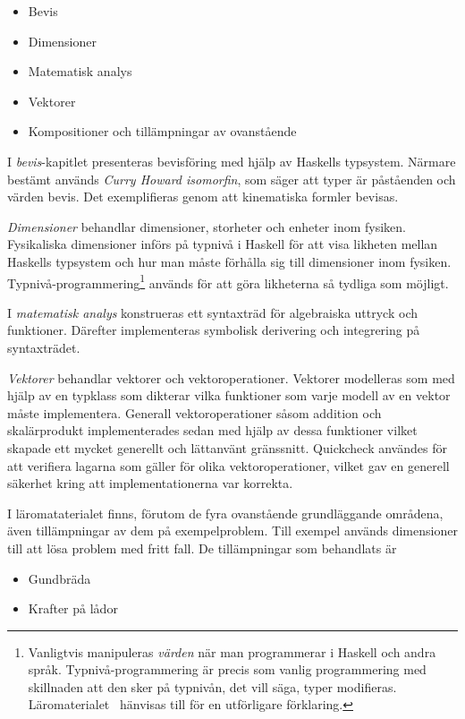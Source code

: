 \begin{draft}
\begin{itemize}
  \item Bevis
  \item Dimensioner
  \item Matematisk analys
  \item Vektorer
  \item Kompositioner och tillämpningar av ovanstående
\end{itemize}

I \textit{bevis}-kapitlet presenteras bevisföring med hjälp av Haskells
typsystem. Närmare bestämt används \textit{Curry Howard isomorfin}, som säger
att typer är påståenden och värden bevis.\cite{chi} Det exemplifieras genom att
kinematiska formler bevisas. 

\textit{Dimensioner} behandlar dimensioner, storheter och enheter inom fysiken.
Fysikaliska dimensioner införs på typnivå i Haskell för att visa likheten mellan
Haskells typsystem och hur man måste förhålla sig till dimensioner inom fysiken.
Typnivå-programmering\footnote{Vanligtvis manipuleras \textit{värden} när man
programmerar i Haskell och andra språk. Typnivå-programmering är precis som
vanlig programmering med skillnaden att den sker på typnivån, det vill säga,
typer modifieras. Läromaterialet~\cite{LYAP} hänvisas till för en utförligare
förklaring.} används för att göra likheterna så tydliga som möjligt.

I \textit{matematisk analys} konstrueras ett syntaxträd för algebraiska uttryck
och funktioner. Därefter implementeras symbolisk derivering och integrering på
syntaxträdet.

\textit{Vektorer} behandlar vektorer och vektoroperationer. Vektorer modelleras
som med hjälp av en typklass som dikterar vilka funktioner som varje
modell av en vektor måste implementera. Generall vektoroperationer såsom
addition och skalärprodukt implementerades sedan med hjälp av dessa funktioner
vilket skapade ett mycket generellt och lättanvänt gränssnitt. Quickcheck
användes för att verifiera lagarna som gäller för olika vektoroperationer,
vilket gav en generell säkerhet kring att implementationerna var korrekta.

I läromataterialet finns, förutom de fyra ovanstående grundläggande områdena,
även tillämpningar av dem på exempelproblem. Till exempel används dimensioner
till att lösa problem med fritt fall. De tillämpningar som behandlats är

\begin{itemize}
  \item Gundbräda
  \item Krafter på lådor
\end{itemize}


\end{draft}
